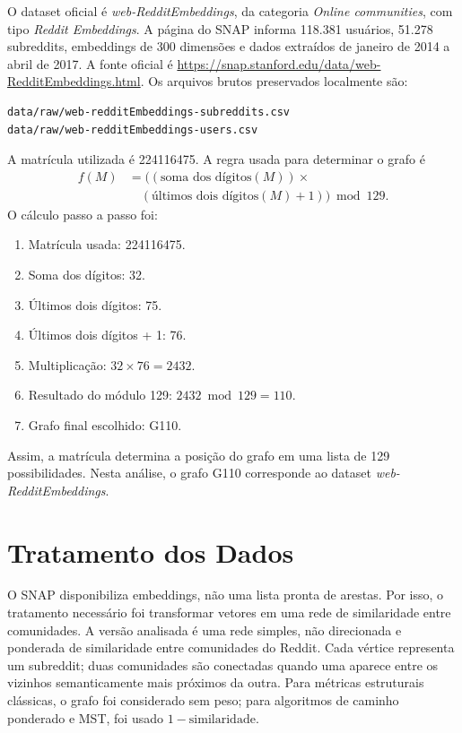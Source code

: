\documentclass[sigconf]{webmedia}
\begin{document}
O dataset oficial é \textit{web-RedditEmbeddings}, da categoria
\textit{Online communities}, com tipo \textit{Reddit Embeddings}. A
página do SNAP informa 118.381 usuários, 51.278 subreddits, embeddings
de 300 dimensões e dados extraídos de janeiro de 2014 a abril de 2017.
A fonte oficial é
\url{https://snap.stanford.edu/data/web-RedditEmbeddings.html}. Os
arquivos brutos preservados localmente são:

\begin{verbatim}
data/raw/web-redditEmbeddings-subreddits.csv
data/raw/web-redditEmbeddings-users.csv
\end{verbatim}

A matrícula utilizada é 224116475. A regra usada para determinar o grafo
é
\[
\begin{aligned}
f(M) &= ((\text{soma dos dígitos}(M)) \times \\
     &\quad (\text{últimos dois dígitos}(M)+1)) \bmod 129.
\end{aligned}
\]
O cálculo passo a passo foi:

\begin{enumerate}
  \item Matrícula usada: 224116475.
  \item Soma dos dígitos: 32.
  \item Últimos dois dígitos: 75.
  \item Últimos dois dígitos + 1: 76.
  \item Multiplicação: $32 \times 76 = 2432$.
  \item Resultado do módulo 129: $2432 \bmod 129 = 110$.
  \item Grafo final escolhido: G110.
\end{enumerate}

Assim, a matrícula determina a posição do grafo em uma lista de 129
possibilidades. Nesta análise, o grafo G110 corresponde ao dataset
\textit{web-RedditEmbeddings}.

\section{Tratamento dos Dados}

O SNAP disponibiliza embeddings, não uma lista pronta de arestas. Por
isso, o tratamento necessário foi transformar vetores em uma rede de
similaridade entre comunidades. A versão analisada é uma rede simples,
não direcionada e ponderada de similaridade entre comunidades do Reddit.
Cada vértice representa um subreddit; duas comunidades são conectadas
quando uma aparece entre os vizinhos semanticamente mais próximos da
outra. Para métricas estruturais clássicas, o grafo foi considerado sem
peso; para algoritmos de caminho ponderado e MST, foi usado
$1-\mathrm{similaridade}$.
\end{document}
